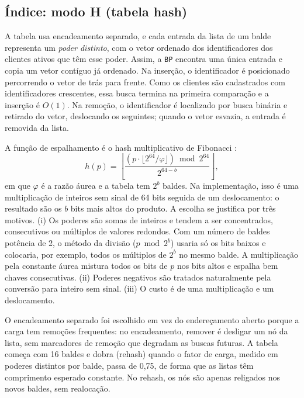 \documentclass[letterpaper]{article} %
\begin{document}
\subsection{\'Indice: modo H (tabela hash)}

A tabela usa encadeamento separado, e cada entrada da lista de um balde representa um \emph{poder distinto}, com o vetor ordenado dos identificadores dos clientes ativos que t\^em esse poder. Assim, a \texttt{BP} encontra uma \'unica entrada e copia um vetor cont\'iguo j\'a ordenado. Na inser\c{c}\~ao, o identificador \'e posicionado percorrendo o vetor de tr\'as para frente. Como os clientes s\~ao cadastrados com identificadores crescentes, essa busca termina na primeira compara\c{c}\~ao e a inser\c{c}\~ao \'e $O(1)$. Na remo\c{c}\~ao, o identificador \'e localizado por busca bin\'aria e retirado do vetor, deslocando os seguintes; quando o vetor esvazia, a entrada \'e removida da lista.

A fun\c{c}\~ao de espalhamento \'e o hash multiplicativo de Fibonacci \citep{knuth1998}:
\[
h(p) = \left\lfloor \frac{(p \cdot \lfloor 2^{64}/\varphi \rfloor) \bmod 2^{64}}{2^{64-b}} \right\rfloor,
\]
em que $\varphi$ \'e a raz\~ao \'aurea e a tabela tem $2^b$ baldes. Na implementa\c{c}\~ao, isso \'e uma multiplica\c{c}\~ao de inteiros sem sinal de 64 bits seguida de um deslocamento: o resultado s\~ao os $b$ bits mais altos do produto. A escolha se justifica por tr\^es motivos. (i) Os poderes s\~ao somas de inteiros e tendem a ser concentrados, consecutivos ou m\'ultiplos de valores redondos. Com um n\'umero de baldes pot\^encia de 2, o m\'etodo da divis\~ao ($p \bmod 2^b$) usaria s\'o os bits baixos e colocaria, por exemplo, todos os m\'ultiplos de $2^b$ no mesmo balde. A multiplica\c{c}\~ao pela constante \'aurea mistura todos os bits de $p$ nos bits altos e espalha bem chaves consecutivas. (ii) Poderes negativos s\~ao tratados naturalmente pela convers\~ao para inteiro sem sinal. (iii) O custo \'e de uma multiplica\c{c}\~ao e um deslocamento.

O encadeamento separado foi escolhido em vez do endere\c{c}amento aberto porque a carga tem remo\c{c}\~oes frequentes: no encadeamento, remover \'e desligar um n\'o da lista, sem marcadores de remo\c{c}\~ao que degradam as buscas futuras. A tabela come\c{c}a com 16 baldes e dobra (rehash) quando o fator de carga, medido em poderes distintos por balde, passa de 0,75, de forma que as listas t\^em comprimento esperado constante. No rehash, os n\'os s\~ao apenas religados nos novos baldes, sem realoca\c{c}\~ao.
\end{document}
